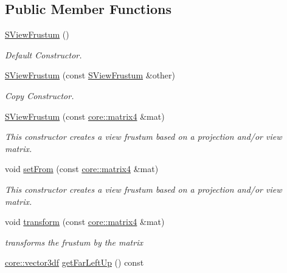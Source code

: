 \subsection*{Public Member Functions}
\begin{DoxyCompactItemize}
\item 
\hyperlink{structirr_1_1scene_1_1SViewFrustum_a7052e88c612bd1239115929e94e6210d}{S\+View\+Frustum} ()\hypertarget{structirr_1_1scene_1_1SViewFrustum_a7052e88c612bd1239115929e94e6210d}{}\label{structirr_1_1scene_1_1SViewFrustum_a7052e88c612bd1239115929e94e6210d}

\begin{DoxyCompactList}\small\item\em Default Constructor. \end{DoxyCompactList}\item 
\hyperlink{structirr_1_1scene_1_1SViewFrustum_aa7cfed3ee9feee79efe02d26f3b14b0c}{S\+View\+Frustum} (const \hyperlink{structirr_1_1scene_1_1SViewFrustum}{S\+View\+Frustum} \&other)
\begin{DoxyCompactList}\small\item\em Copy Constructor. \end{DoxyCompactList}\item 
\hyperlink{structirr_1_1scene_1_1SViewFrustum_acfcbb01f1e26f73ee1d9c7695302a508}{S\+View\+Frustum} (const \hyperlink{namespaceirr_1_1core_a73fa92e638c5ca97efd72da307cc9b65}{core\+::matrix4} \&mat)\hypertarget{structirr_1_1scene_1_1SViewFrustum_acfcbb01f1e26f73ee1d9c7695302a508}{}\label{structirr_1_1scene_1_1SViewFrustum_acfcbb01f1e26f73ee1d9c7695302a508}

\begin{DoxyCompactList}\small\item\em This constructor creates a view frustum based on a projection and/or view matrix. \end{DoxyCompactList}\item 
void \hyperlink{structirr_1_1scene_1_1SViewFrustum_a2517bde9292aa26119d75b9ff0b92833}{set\+From} (const \hyperlink{namespaceirr_1_1core_a73fa92e638c5ca97efd72da307cc9b65}{core\+::matrix4} \&mat)
\begin{DoxyCompactList}\small\item\em This constructor creates a view frustum based on a projection and/or view matrix. \end{DoxyCompactList}\item 
void \hyperlink{structirr_1_1scene_1_1SViewFrustum_aeabadaf532f08ba3cb98b897ff0619f2}{transform} (const \hyperlink{namespaceirr_1_1core_a73fa92e638c5ca97efd72da307cc9b65}{core\+::matrix4} \&mat)
\begin{DoxyCompactList}\small\item\em transforms the frustum by the matrix \end{DoxyCompactList}\item 
\hyperlink{namespaceirr_1_1core_a06f169d08b5c429f5575acb7edbad811}{core\+::vector3df} \hyperlink{structirr_1_1scene_1_1SViewFrustum_a99712510130276f440e2c399dde7e5f3}{get\+Far\+Left\+Up} () const \hypertarget{structirr_1_1scene_1_1SViewFrustum_a99712510130276f440e2c399dde7e5f3}{}\label{structirr_1_1scene_1_1SViewFrustum_a99712510130276f440e2c399dde7e5f3}


\end{DoxyCompactItemize}

